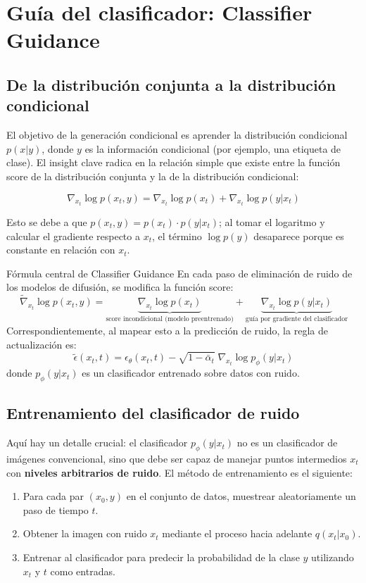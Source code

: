 \section{Guía del clasificador: Classifier Guidance}

\subsection{De la distribución conjunta a la distribución condicional}

El objetivo de la generación condicional es aprender la distribución condicional $p(x|y)$, donde $y$ es la información condicional (por ejemplo, una etiqueta de clase). El insight clave radica en la relación simple que existe entre la función score de la distribución conjunta y la de la distribución condicional:

$$
\nabla_{x_t}\log p(x_t, y) = \nabla_{x_t}\log p(x_t) + \nabla_{x_t}\log p(y|x_t)
$$

Esto se debe a que $p(x_t, y) = p(x_t)\cdot p(y|x_t)$; al tomar el logaritmo y calcular el gradiente respecto a $x_t$, el término $\log p(y)$ desaparece porque es constante en relación con $x_t$.

\begin{importantbox}{Fórmula central de Classifier Guidance}
En cada paso de eliminación de ruido de los modelos de difusión, se modifica la función score:
$$
\tilde{\nabla}_{x_t}\log p(x_t, y) = \underbrace{\nabla_{x_t}\log p(x_t)}_{\text{score incondicional (modelo preentrenado)}} + \underbrace{\nabla_{x_t}\log p(y|x_t)}_{\text{guía por gradiente del clasificador}}
$$
Correspondientemente, al mapear esto a la predicción de ruido, la regla de actualización es:
$$
\tilde{\epsilon}(x_t, t) = \epsilon_\theta(x_t, t) - \sqrt{1-\bar\alpha_t}\;\nabla_{x_t}\log p_\phi(y|x_t)
$$
donde $p_\phi(y|x_t)$ es un clasificador entrenado sobre datos con ruido.
\end{importantbox}

\subsection{Entrenamiento del clasificador de ruido}

Aquí hay un detalle crucial: el clasificador $p_\phi(y|x_t)$ no es un clasificador de imágenes convencional, sino que debe ser capaz de manejar puntos intermedios $x_t$ con \textbf{niveles arbitrarios de ruido}. El método de entrenamiento es el siguiente:

\begin{enumerate}
    \item Para cada par $(x_0, y)$ en el conjunto de datos, muestrear aleatoriamente un paso de tiempo $t$.
    \item Obtener la imagen con ruido $x_t$ mediante el proceso hacia adelante $q(x_t|x_0)$.
    \item Entrenar al clasificador para predecir la probabilidad de la clase $y$ utilizando $x_t$ y $t$ como entradas.
\end{enumerate}

